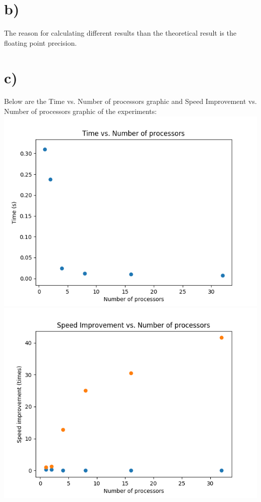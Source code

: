 \documentclass[12pt]{article}
\begin{document}
\section*{b)}
The reason for calculating different results than the theoretical result is the floating point precision.
\section*{c)}
Below are the Time vs. Number of processors graphic and Speed Improvement vs. Number of processors graphic of the experiments:\\
\includegraphics[scale=1]{plot1}\\
\includegraphics[scale=1]{plot2} \\
\end{document}
